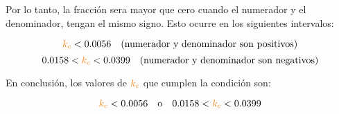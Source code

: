 Por lo tanto, la fracción sera mayor que cero cuando el numerador y el denominador, tengan el mismo signo. Esto ocurre en los siguientes intervalos:

\[
\nara{k_c} < 0.0056 \quad \text{(numerador y denominador son positivos)}
\]
\[
0.0158 < \nara{k_c} < 0.0399 \quad \text{(numerador y denominador son negativos)}
\]

En conclusión, los valores de $\nara{k_c}$ que cumplen la condición son:

\[
\nara{k_c} < 0.0056 \quad \text{o} \quad 0.0158 < \nara{k_c} < 0.0399
\]


